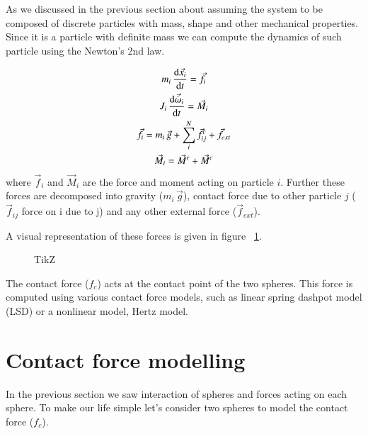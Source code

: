 As we discussed in the previous section about assuming the system to be composed
of discrete particles with mass, shape and other mechanical properties. Since it
is a particle with definite mass we can compute the dynamics of such particle
using the Newton's 2nd law.


\begin{gather}
  \label{eq:dem:equations_of_motion}
  m_i \, \dv{\vec{x}_i}{t} = \vec{f}_i\\
  J_i \, \dv{\vec{\dot{\omega}}_i}{t} = \vec{M}_i\\
  \vec{f}_i = m_i \,\vec{g} + \sum_i^N \vec{f}_{ij}^c + \vec{f}_{ext}\\
  \vec{M}_i = \vec{M}^r + \vec{M}^c
\end{gather}
where $\vec{f}_i$ and $\vec{M}_i$ are the force and moment acting on particle
$i$. Further these forces are decomposed into gravity ($m_i \, \vec{g}$),
contact force due to other particle $j$ ($\vec{f}_{ij}$ force on i due to j) and
any other external force ($\vec{f}_{ext}$).

A visual representation of these forces is given in figure
~\ref{fig:basic_forces_dem}.

\begin{figure}[htb]
  \centering
  \caption{TikZ}
  \label{fig:basic_forces_dem}
\end{figure}

The contact force ($f_c$) acts at the contact point of the two spheres. This
force is computed using various contact force models, such as linear spring
dashpot model (LSD) or a nonlinear model, Hertz model.


\section{Contact force modelling}
\label{sec:cont-force-modell}

In the previous section we saw interaction of spheres and forces acting on each
sphere. To make our life simple let's consider two spheres to model the contact
force ($f_c$).








